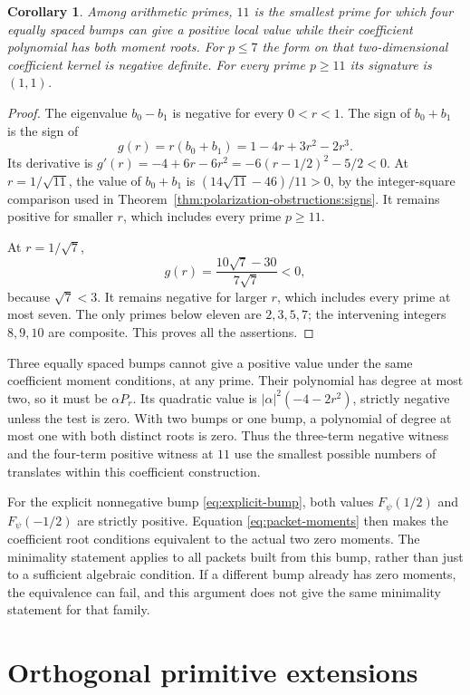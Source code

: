 \documentclass[11pt,letterpaper]{article}
\newtheorem{corollary}[theorem]{Corollary}
\theoremstyle{definition}
\theoremstyle{remark}
\begin{document}
\begin{corollary}
\label{cor:smallest-prime}
Among arithmetic primes, $11$ is the smallest prime for
which four equally spaced bumps can give a positive local
value while their coefficient polynomial has both moment
roots. For $p\leq7$ the form on that two-dimensional
coefficient kernel is negative definite. For every prime
$p\geq11$ its signature is $(1,1)$.
\end{corollary}
\begin{proof}
The eigenvalue $b_0-b_1$ is negative for every $0<r<1$.
The sign of $b_0+b_1$ is the sign of
\[
 g(r)=r(b_0+b_1)=1-4r+3r^2-2r^3.
\]
Its derivative is
$g'(r)=-4+6r-6r^2=-6(r-1/2)^2-5/2<0$.
At $r=1/\sqrt{11}$, the value of $b_0+b_1$ is
$(14\sqrt{11}-46)/11>0$, by the integer-square
comparison used in Theorem~\ref{thm:polarization-obstructions:signs}.
It remains positive for smaller $r$, which includes every
prime $p\geq11$.

At $r=1/\sqrt7$,
\[
 g(r)=\frac{10\sqrt7-30}{7\sqrt7}<0,
\]
because $\sqrt7<3$. It remains negative for larger $r$,
which includes every prime at most seven. The only primes
below eleven are $2,3,5,7$; the intervening integers
$8,9,10$ are composite. This proves all the assertions.
\end{proof}

Three equally spaced bumps cannot give a positive value
under the same coefficient moment conditions, at any prime.
Their polynomial has degree at most two, so it must be
$\alpha P_r$. Its quadratic value is
$|\alpha|^2(-4-2r^2)$, strictly negative unless the test is
zero. With two bumps or one bump, a polynomial of degree
at most one with both distinct roots is zero. Thus the
three-term negative witness and the four-term positive
witness at $11$ use the smallest possible numbers of
translates within this coefficient construction.

For the explicit nonnegative bump
\eqref{eq:explicit-bump}, both values $F_\psi(1/2)$ and
$F_\psi(-1/2)$ are strictly positive. Equation
\eqref{eq:packet-moments} then makes the coefficient
root conditions equivalent to the actual two zero moments.
The minimality statement applies to all packets built from
this bump, rather than just to a sufficient algebraic
condition. If a different bump already has zero moments,
the equivalence can fail, and this argument does not give
the same minimality statement for that family.

\section{Orthogonal primitive extensions}
\label{sec:extensions}
\end{document}
